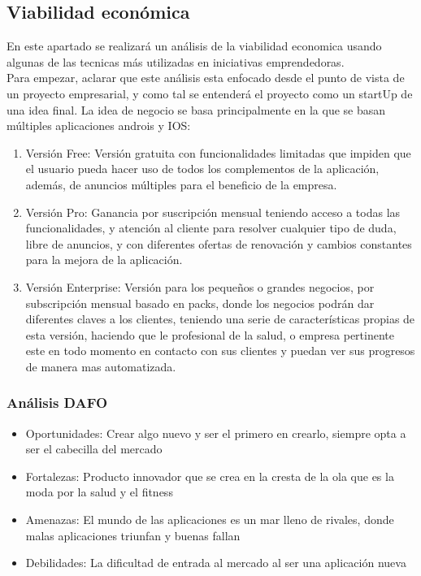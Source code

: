 \subsection{Viabilidad económica}
En este apartado se realizará un análisis de la viabilidad economica usando algunas de las tecnicas más utilizadas en iniciativas emprendedoras.\\
Para empezar,  aclarar que este análisis esta enfocado desde el punto de vista de un proyecto empresarial, y como tal se entenderá el proyecto como un startUp de una idea final.
La idea de negocio se basa principalmente en la que se basan múltiples aplicaciones androis y IOS:
\begin{enumerate}
\item Versión Free: Versión gratuita con funcionalidades limitadas que impiden que el usuario pueda hacer uso de todos los complementos de la aplicación, además, de anuncios múltiples para el beneficio de la empresa.
\item Versión Pro: Ganancia por suscripción mensual teniendo acceso a todas las funcionalidades, y atención al cliente para resolver cualquier tipo de duda, libre de anuncios, y con diferentes ofertas de renovación y cambios constantes para la mejora de la aplicación.
\item Versión Enterprise: Versión para los pequeños o grandes negocios, por subscripción mensual basado en packs, donde los negocios podrán dar diferentes claves a los clientes, teniendo una serie de características propias de esta versión, haciendo que le profesional de la salud, o empresa pertinente este en todo momento en contacto con sus clientes y puedan ver sus progresos de manera mas automatizada.
\end{enumerate}
\subsubsection{Análisis DAFO}
\begin{itemize}
\item Oportunidades: Crear algo nuevo y ser el primero en crearlo, siempre opta a ser el cabecilla del mercado
\item Fortalezas: Producto innovador que se crea en la cresta de la ola que es la moda por la salud y el fitness
\item Amenazas: El mundo de las aplicaciones es un mar lleno de rivales, donde malas aplicaciones triunfan y buenas fallan
\item Debilidades: La dificultad de entrada al mercado al ser una aplicación nueva	
\end{itemize}
